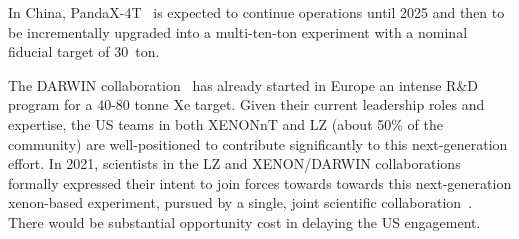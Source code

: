In China, PandaX-4T~\cite{Kang:2010zza,PandaX:2018wtu,PandaX-4T:2021bab}
is expected to continue operations until 2025 and then to be incrementally upgraded into a multi-ten-ton experiment with a nominal fiducial target of 30~ton.


The DARWIN collaboration~\cite{DARWIN:2016hyl} has already started in Europe an intense R\&D program for a 40-80 tonne Xe target. Given their current leadership roles and expertise, the US teams in both XENONnT and LZ (about 50\% of the community) are well-positioned to contribute significantly to this next-generation effort.   
In 2021, scientists in the LZ and XENON/DARWIN collaborations formally expressed their intent to join forces towards towards this next-generation xenon-based experiment, pursued by a single, joint scientific collaboration~\cite{mou}.
There would be substantial opportunity cost in delaying the US engagement.

